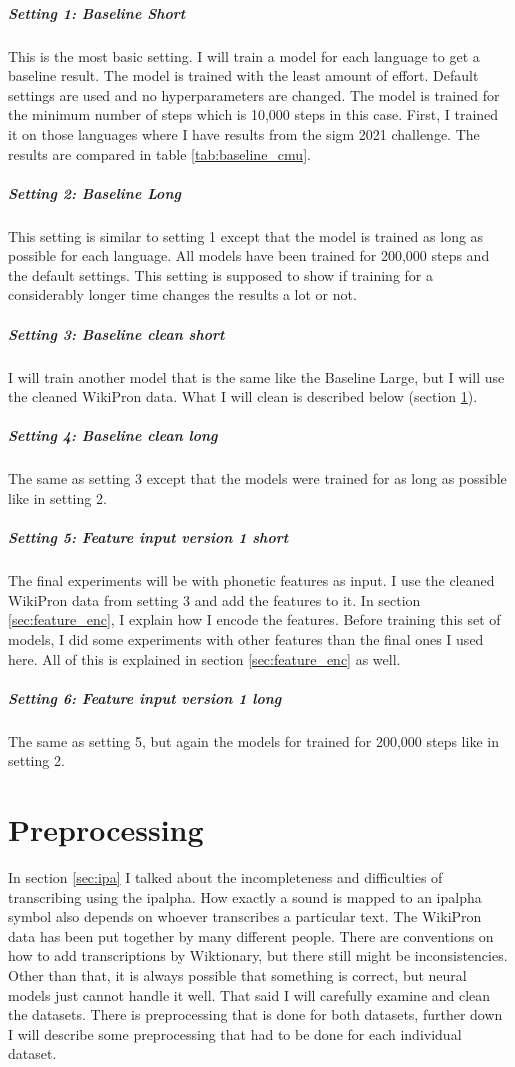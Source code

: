 \subparagraph{Setting 1: Baseline Short}
This is the most basic setting. I will train a model for each language to get a baseline result. The model is trained with the least amount of effort. Default settings are used and no hyperparameters are changed. The model is trained for the minimum number of steps which is 10,000 steps in this case. First, I trained it on those languages where I have results from the \ac{sigm} 2021 challenge. The results are compared in table \ref{tab:baseline_cmu}.

\subparagraph{Setting 2: Baseline Long}
This setting is similar to setting 1 except that the model is trained as long as possible for each language. All models have been trained for 200,000 steps and the default settings. This setting is supposed to show if training for a considerably longer time changes the results a lot or not.

\subparagraph{Setting 3: Baseline clean short}
I will train another model that is the same like the Baseline Large, but I will use the cleaned WikiPron data. What I will clean is described below (section \ref{preprocess}).

\subparagraph{Setting 4: Baseline clean long}
The same as setting 3 except that the models were trained for as long as possible like in setting 2.

\subparagraph{Setting 5: Feature input version 1 short}
The final experiments will be with phonetic features as input. I use the cleaned WikiPron data from setting 3 and add the features to it. In section \ref{sec:feature_enc}, I explain how I encode the features. Before training this set of models, I did some experiments with other features than the final ones I used here. All of this is explained in section \ref{sec:feature_enc} as well.

\subparagraph{Setting 6: Feature input version 1 long}
The same as setting 5, but again the models for trained for 200,000 steps like in setting 2.

\section{Preprocessing}
\label{preprocess}
In section \ref{sec:ipa} I talked about the incompleteness and difficulties of transcribing using the \ac{ipalpha}. How exactly a sound is mapped to an \ac{ipalpha} symbol also depends on whoever transcribes a particular text. The WikiPron data has been put together by many different people. There are conventions on how to add transcriptions by Wiktionary, but there still might be inconsistencies. Other than that, it is always possible that something is correct, but neural models just cannot handle it well. That said I will carefully examine and clean the datasets. There is preprocessing that is done for both datasets, further down I will describe some preprocessing that had to be done for each individual dataset.

